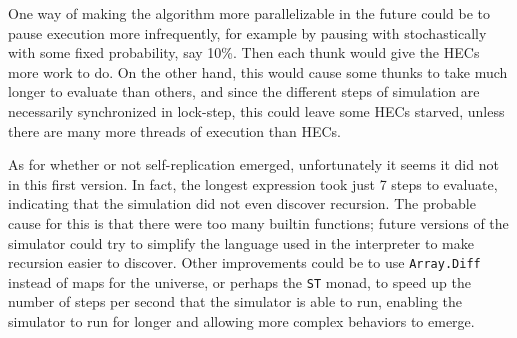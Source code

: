 \documentclass[letterpaper,11pt]{article}
\begin{document}
One way of making the algorithm more parallelizable in the future could be to pause execution more infrequently, for example by pausing with stochastically with some fixed probability, say 10\%. Then each thunk would give the HECs more work to do. On the other hand, this would cause some thunks to take much longer to evaluate than others, and since the different steps of simulation are necessarily synchronized in lock-step, this could leave some HECs starved, unless there are many more threads of execution than HECs.

As for whether or not self-replication emerged, unfortunately it seems it did not in this first version. In fact, the longest expression took just 7 steps to evaluate, indicating that the simulation did not even discover recursion. The probable cause for this is that there were too many builtin functions; future versions of the simulator could try to simplify the language used in the interpreter to make recursion easier to discover. Other improvements could be to use \texttt{Array.Diff} instead of maps for the universe, or perhaps the \texttt{ST} monad, to speed up the number of steps per second that the simulator is able to run, enabling the simulator to run for longer and allowing more complex behaviors to emerge.
\end{document}
